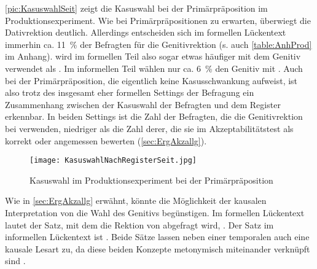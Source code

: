 \autoref{pic:KasuswahlSeit} zeigt die Kasuswahl bei der Primärpräposition  im Produktionsexperiment. 
Wie bei Primärpräpositionen zu erwarten, überwiegt die Dativrektion deutlich. 
Allerdings entscheiden sich im formellen Lückentext immerhin ca. 11~\% der Befragten für die Genitivrektion (s. auch \autoref{table:AnhProd} im Anhang). 
 wird im formellen Teil also sogar etwas häufiger mit dem Genitiv verwendet als \gegenueber. 
Im informellen Teil wählen nur ca. 6~\% den Genitiv mit . 
Auch bei der Primärpräposition, die eigentlich keine Kasusschwankung aufweist, ist also trotz des insgesamt eher formellen Settings der Befragung ein Zusammenhang zwischen der Kasuswahl der Befragten und dem Register erkennbar. 
In beiden Settings ist die Zahl der Befragten, die die Genitivrektion bei  verwenden, niedriger als die Zahl derer, die sie im Akzeptabilitätstest als korrekt oder angemessen bewerten (\autoref{sec:ErgAkzallg}). 
\begin{figure}
\centering
\texttt{[image: KasuswahlNachRegisterSeit.jpg]}
\caption{Kasuswahl im Produktionsexperiment bei der Primärpräposition }
\label{pic:KasuswahlSeit}
\end{figure}

Wie in \autoref{sec:ErgAkzallg} erwähnt, könnte die Möglichkeit der kausalen Interpretation von  die Wahl des Genitivs begünstigen. 
Im formellen Lückentext lautet der Satz, mit dem die Rektion von  abgefragt wird, .
Der Satz im informellen Lückentext ist .
Beide Sätze lassen neben einer temporalen auch eine kausale Lesart zu, da diese beiden Konzepte metonymisch miteinander verknüpft sind \citep[s.][]{Traugott.1991}. 

